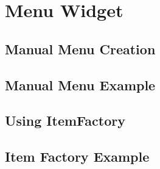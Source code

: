\chapter{Menu Widget}
\section{Manual Menu Creation}
\section{Manual Menu Example}
\section{Using ItemFactory}
\section{Item Factory Example}
